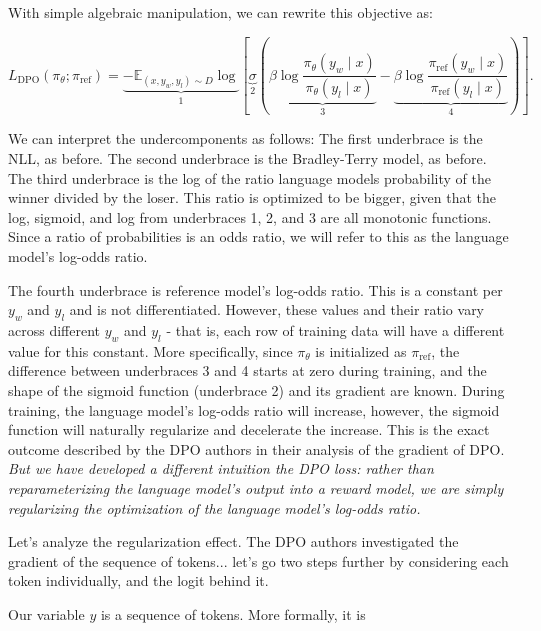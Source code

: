 \documentclass[twoside,11pt]{article}
\begin{document}
With simple algebraic manipulation, we can rewrite this objective as:

\begin{equation}
  \label{eq:reg}
  L_\mathrm{DPO}(\pi_\theta; \pi_\mathrm{ref}) =
  \underbrace{
  -\mathbb{E}_{(x, y_w, y_l) \sim D} 
  \log }_{1} 
  \left[ 
    \underbrace{\sigma }_{2}
    \left(
    \underbrace{\beta \log \frac{\pi_\theta(y_w \mid x)}{\pi_\theta(y_l \mid x)}}_{3}
    - \underbrace{\beta \log \frac{\pi_\mathrm{ref}(y_w \mid x)}{\pi_\mathrm{ref}(y_l \mid x)}}_{4} 
    \right)
  \right].
  \end{equation}  

We can interpret the undercomponents as follows: The first underbrace is the NLL, as before. 
The second underbrace is the
Bradley-Terry model, as before. 
The third underbrace is the log of the ratio
language models probability of the winner divided by the loser. This ratio 
is optimized to be bigger, given that the log, sigmoid, and log from underbraces
1, 2, and 3 are all monotonic functions. Since a ratio of probabilities is
an odds ratio, we will refer to this as the 
language model's log-odds ratio. 

The fourth underbrace is reference model's log-odds ratio. This
is a constant per $y_w$ and $y_l$ and is not differentiated. However,
these values and their ratio vary across different $y_w$ and $y_l$ - that is,
each row of training data will have a different value for this constant. 
More specifically, since $\pi_\theta$ is initialized as $\pi_\mathrm{ref}$, 
the difference between underbraces 3 and 4 starts at zero during training, 
and the shape of the sigmoid function (underbrace 2) and its gradient are
known. During training, the language model's log-odds ratio will increase,
however, the sigmoid function will naturally regularize and decelerate
the increase. This is the exact outcome described by the DPO authors 
in their analysis of the gradient of DPO. \emph{But we have developed a different
intuition the DPO loss: rather than reparameterizing the language model's
output into a reward model, we are simply regularizing the optimization of 
the language model's log-odds ratio.}

Let's analyze the regularization effect. The DPO authors investigated
the gradient of the sequence of tokens... let's go two steps further
by considering each token individually, and the logit behind it. 

Our variable $y$ is a sequence of tokens. More formally, it is
\end{document}
